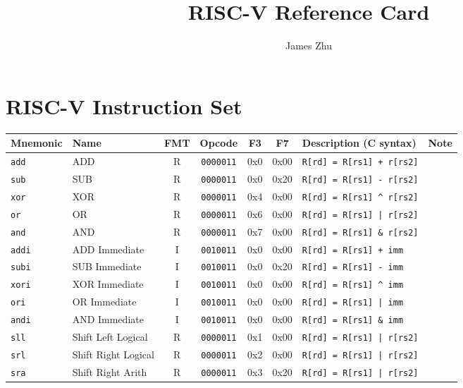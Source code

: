 \documentclass{article}
\newcommand{\code}[1]{\texttt{#1}}
\begin{document}
\pretitle{\vspace{-0.75in}\begin{center}\LARGE \textbf }
\title{RISC-V Reference Card}
\posttitle{\par\end{center}}
\author{James Zhu}
\predate{}
\date{}
\postdate{}
\maketitle

\section*{RISC-V Instruction Set}

\begin{tabular}
{l | l | c | c | c | c | l | l}
Mnemonic    & Name                  & FMT & Opcode        & F3  & F7    & Description (C syntax)  & Note \\ \hline
\code{add}  & ADD                   & R  & \code{0000011} & 0x0 & 0x00  & \code{R[rd] = R[rs1] + r[rs2]} \\
\code{sub}  & SUB                   & R  & \code{0000011} & 0x0 & 0x20  & \code{R[rd] = R[rs1] - r[rs2]} \\
\code{xor}  & XOR                   & R  & \code{0000011} & 0x4 & 0x00  & \code{R[rd] = R[rs1] \^{} r[rs2]} \\
\code{or}   & OR                    & R  & \code{0000011} & 0x6 & 0x00  & \code{R[rd] = R[rs1] | r[rs2]} \\
\code{and}  & AND                   & R  & \code{0000011} & 0x7 & 0x00  & \code{R[rd] = R[rs1] \& r[rs2]} \\ \hline

\code{addi} & ADD Immediate         & I  & \code{0010011} & 0x0 & 0x00  & \code{R[rd] = R[rs1] + imm} \\
\code{subi} & SUB Immediate         & I  & \code{0010011} & 0x0 & 0x20  & \code{R[rd] = R[rs1] - imm} \\
\code{xori} & XOR Immediate         & I  & \code{0010011} & 0x0 & 0x00  & \code{R[rd] = R[rs1] \^{} imm} \\
\code{ori}  & OR Immediate          & I  & \code{0010011} & 0x0 & 0x00  & \code{R[rd] = R[rs1] | imm} \\
\code{andi} & AND Immediate         & I  & \code{0010011} & 0x0 & 0x00  & \code{R[rd] = R[rs1] \& imm} \\ \hline

\code{sll}  & Shift Left Logical    & R  & \code{0000011} & 0x1 & 0x00  & \code{R[rd] = R[rs1] | r[rs2]} \\
\code{srl}  & Shift Right Logical   & R  & \code{0000011} & 0x2 & 0x00  & \code{R[rd] = R[rs1] | r[rs2]} \\
\code{sra}  & Shift Right Arith     & R  & \code{0000011} & 0x3 & 0x20  & \code{R[rd] = R[rs1] | r[rs2]} \\ \hline


\end{tabular}
\end{document}
